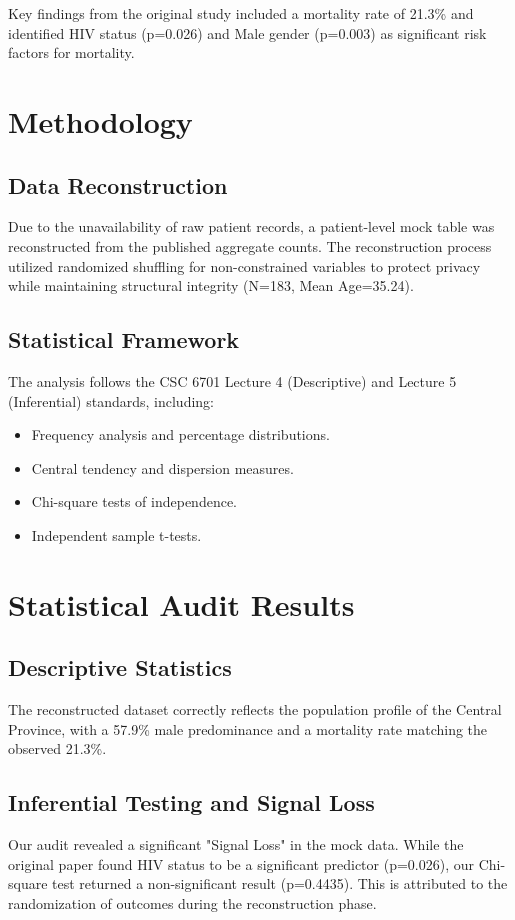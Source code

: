 \documentclass[12pt,a4paper]{report}
\begin{document}
Key findings from the original study included a mortality rate of 21.3\% and identified HIV status (p=0.026) and Male gender (p=0.003) as significant risk factors for mortality.

\chapter{Methodology}
\section{Data Reconstruction}
Due to the unavailability of raw patient records, a patient-level mock table was reconstructed from the published aggregate counts. The reconstruction process utilized randomized shuffling for non-constrained variables to protect privacy while maintaining structural integrity (N=183, Mean Age=35.24).

\section{Statistical Framework}
The analysis follows the CSC 6701 Lecture 4 (Descriptive) and Lecture 5 (Inferential) standards, including:
\begin{itemize}
    \item Frequency analysis and percentage distributions.
    \item Central tendency and dispersion measures.
    \item Chi-square tests of independence.
    \item Independent sample t-tests.
\end{itemize}

\chapter{Statistical Audit Results}
\section{Descriptive Statistics}
The reconstructed dataset correctly reflects the population profile of the Central Province, with a 57.9\% male predominance and a mortality rate matching the observed 21.3\%.

\section{Inferential Testing and Signal Loss}
Our audit revealed a significant "Signal Loss" in the mock data. While the original paper found HIV status to be a significant predictor (p=0.026), our Chi-square test returned a non-significant result (p=0.4435). This is attributed to the randomization of outcomes during the reconstruction phase.
\end{document}
